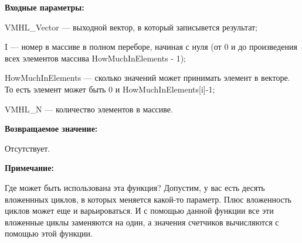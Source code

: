 \textbf{Входные параметры:}

VMHL\_Vector --- выходной вектор, в который записывется результат;
 
I --- номер в массиве в полном переборе, начиная с нуля (от 0 и до произведения всех элементов массива HowMuchInElements - 1);
 
HowMuchInElements --- сколько значений может принимать элемент в векторе. То есть элемент может быть 0 и HowMuchInElements[i]-1;
 
VMHL\_N --- количество элементов в массиве.

\textbf{Возвращаемое значение:}
 
Отсутствует.

\textbf{Примечание:}
 
Где может быть использована эта функция? Допустим, у вас есть десять вложеннных циклов, в которых меняется какой-то параметр. Плюс вложенность циклов может еще и варьироваться. И с помощью данной функции все эти вложенные циклы заменяются на один, а значения счетчиков вычисляются с помощью этой функции.